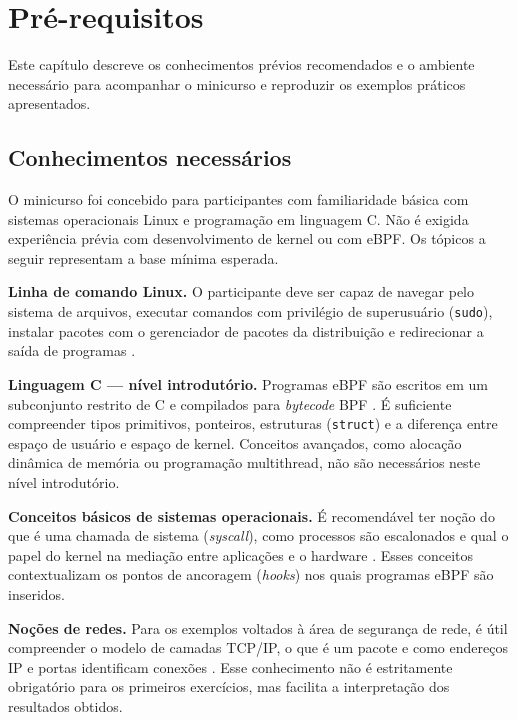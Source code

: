 \chapter{Pré-requisitos}

Este capítulo descreve os conhecimentos prévios recomendados e o ambiente necessário
para acompanhar o minicurso e reproduzir os exemplos práticos apresentados.

\section{Conhecimentos necessários}

O minicurso foi concebido para participantes com familiaridade básica com sistemas
operacionais Linux e programação em linguagem C.
Não é exigida experiência prévia com desenvolvimento de kernel ou com eBPF.
Os tópicos a seguir representam a base mínima esperada.

\textbf{Linha de comando Linux.}
O participante deve ser capaz de navegar pelo sistema de arquivos, executar comandos
com privilégio de superusuário (\texttt{sudo}), instalar pacotes com o gerenciador
de pacotes da distribuição e redirecionar a saída de programas
\cite{manpages2024}.

\textbf{Linguagem C — nível introdutório.}
Programas eBPF são escritos em um subconjunto restrito de C e compilados para
\textit{bytecode} BPF \cite{linuxkernel2024}.
É suficiente compreender tipos primitivos, ponteiros, estruturas (\texttt{struct}) e
a diferença entre espaço de usuário e espaço de kernel.
Conceitos avançados, como alocação dinâmica de memória ou programação
multithread, não são necessários neste nível introdutório.

\textbf{Conceitos básicos de sistemas operacionais.}
É recomendável ter noção do que é uma chamada de sistema (\textit{syscall}),
como processos são escalonados e qual o papel do kernel na mediação entre
aplicações e o hardware \cite{gregg2020}.
Esses conceitos contextualizam os pontos de ancoragem (\textit{hooks}) nos quais
programas eBPF são inseridos.

\textbf{Noções de redes.}
Para os exemplos voltados à área de segurança de rede, é útil compreender o modelo
de camadas TCP/IP, o que é um pacote e como endereços IP e portas identificam
conexões \cite{gregg2019}.
Esse conhecimento não é estritamente obrigatório para os primeiros exercícios,
mas facilita a interpretação dos resultados obtidos.

